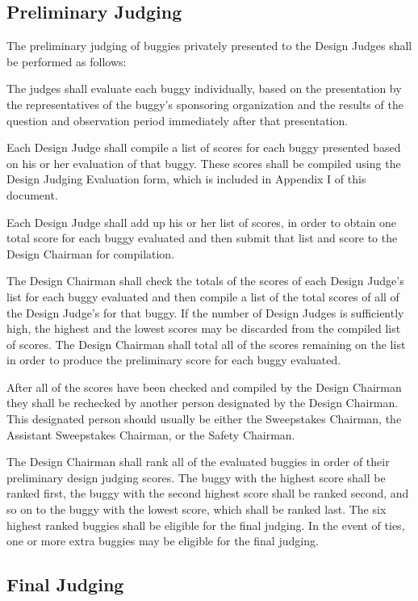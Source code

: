 \subsection{Preliminary Judging}

	The preliminary judging of buggies privately presented to the Design Judges shall be performed as follows:
	\newline

	The judges shall evaluate each buggy individually, based on the presentation by the representatives of the buggy's sponsoring organization and the results of the question and observation period immediately after that presentation.

	Each Design Judge shall compile a list of scores for each buggy presented based on his or her evaluation of that buggy. These scores shall be compiled using the Design Judging Evaluation form, which is included in Appendix I of this document.

	Each Design Judge shall add up his or her list of scores, in order to obtain one total score for each buggy evaluated and then submit that list and score to the Design Chairman for compilation.

	The Design Chairman shall check the totals of the scores of each Design Judge's list for each buggy evaluated and then compile a list of the total scores of all of the Design Judge's for that buggy. If the number of Design Judges is sufficiently high, the highest and the lowest scores may be discarded from the compiled list of scores. The Design Chairman shall total all of the scores remaining on the list in order to produce the preliminary score for each buggy evaluated.
	
	After all of the scores have been checked and compiled by the Design Chairman they shall be rechecked by another person designated by the Design Chairman. This designated person should usually be either the Sweepstakes Chairman, the Assistant Sweepstakes Chairman, or the Safety Chairman.

	The Design Chairman shall rank all of the evaluated buggies in order of their preliminary design judging scores. The buggy with the highest score shall be ranked first, the buggy with the second highest score shall be ranked second, and so on to the buggy with the lowest score, which shall be ranked last. The six highest ranked buggies shall be eligible for the final judging. In the event of ties, one or more extra buggies may be eligible for the final judging.

\subsection{Final Judging}

